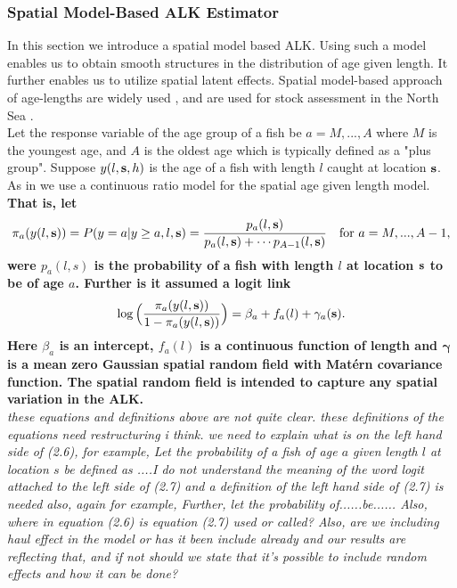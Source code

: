 \documentclass[a4paper 12pt]{article}
\numberwithin{equation}{section}
\begin{document}
\subsubsection{Spatial Model-Based ALK Estimator}
\label{sec:spatialModelALK}
In this section we introduce a spatial model based ALK. Using such a model enables us to obtain smooth structures in the distribution of age given length. It further enables us to utilize spatial latent effects. Spatial model-based approach of age-lengths are widely used \citep{berg2012spatial, hirst2012bayesian, rindorf2001analyses}, and are used for stock assessment in the North Sea \citep{berg2014evaluation}. \\ %
\indent Let the response variable of the age group of a fish be $a = M,...,A$ where $M$ is the youngest age, and $A$ is the oldest age which is typically defined as a "plus group". Suppose $y(l,{\bf s},h)$ is the age  of a fish with length $l$ caught at location ${\bf s}$. As in \citet{berg2012spatial} we use a continuous ratio model for the spatial age given length model. {\bf That is, let
\begin{align}\label{eq:linearPred1}
\pi_a(y(l,{\bf s})) = P(y = a|y \geq a, l, {\bf s}) = \frac{p_a(l,{\bf s})}{p_a(l,{\bf s}) + \cdots p_{A-1}(l,{\bf s})} \vspace{ 4mm} \ \ \ \text{for } a =M,...,A-1 ,
\end{align}
were $p_a(l,s)$ is the probability of a fish with length $l$ at location ${\bf s}$ to be of age $a$. Further is it assumed a logit link
\begin{align}\label{eq:linearPred}
\log \Big( \frac{\pi_a(y(l,{\bf s}))}{1-\pi_a(y(l,{\bf s}))}\Big ) = \beta_a +  f_a(l) + \gamma_a({\bf s}).
\end{align}
Here $\beta_a$ is an intercept, $ f_a(l)$ is a continuous function of length and $\pmb{\gamma}$ is a mean zero Gaussian spatial random field with Mat\'{e}rn covariance function. The spatial random field is intended to capture any spatial variation in the ALK.} \\
\emph{these equations and definitions above are not quite clear. these definitions of the equations need restructuring i think. we need to explain what is on the left hand side of (2.6), for example, Let the probability of a fish of age $a$ given length $l$ at location $s$ be defined as ....I do not understand the meaning of the word logit attached to the left side of (2.7) and a definition of the left hand side of (2.7) is needed also, again for example, Further, let the probability of......be...... Also, where in equation (2.6) is equation (2.7) used or called? Also, are we including haul effect in the model or has it been include already and our results are reflecting that, and if not should we state that it's possible to include random effects and how it can be done?}\\
\end{document}

